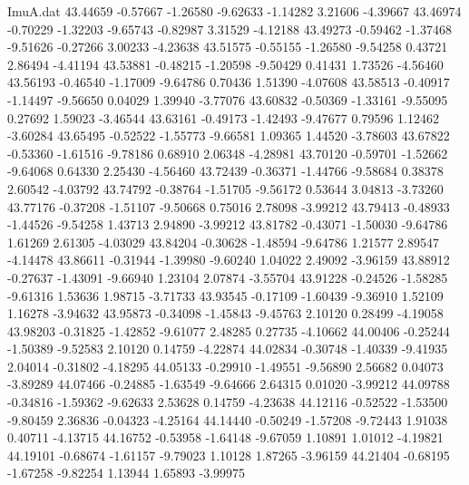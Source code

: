 \begin{filecontents}{ImuA.dat}
  43.44659   -0.57667   -1.26580   -9.62633   -1.14282    3.21606   -4.39667
  43.46974   -0.70229   -1.32203   -9.65743   -0.82987    3.31529   -4.12188
  43.49273   -0.59462   -1.37468   -9.51626   -0.27266    3.00233   -4.23638
  43.51575   -0.55155   -1.26580   -9.54258    0.43721    2.86494   -4.41194
  43.53881   -0.48215   -1.20598   -9.50429    0.41431    1.73526   -4.56460
  43.56193   -0.46540   -1.17009   -9.64786    0.70436    1.51390   -4.07608
  43.58513   -0.40917   -1.14497   -9.56650    0.04029    1.39940   -3.77076
  43.60832   -0.50369   -1.33161   -9.55095    0.27692    1.59023   -3.46544
  43.63161   -0.49173   -1.42493   -9.47677    0.79596    1.12462   -3.60284
  43.65495   -0.52522   -1.55773   -9.66581    1.09365    1.44520   -3.78603
  43.67822   -0.53360   -1.61516   -9.78186    0.68910    2.06348   -4.28981
  43.70120   -0.59701   -1.52662   -9.64068    0.64330    2.25430   -4.56460
  43.72439   -0.36371   -1.44766   -9.58684    0.38378    2.60542   -4.03792
  43.74792   -0.38764   -1.51705   -9.56172    0.53644    3.04813   -3.73260
  43.77176   -0.37208   -1.51107   -9.50668    0.75016    2.78098   -3.99212
  43.79413   -0.48933   -1.44526   -9.54258    1.43713    2.94890   -3.99212
  43.81782   -0.43071   -1.50030   -9.64786    1.61269    2.61305   -4.03029
  43.84204   -0.30628   -1.48594   -9.64786    1.21577    2.89547   -4.14478
  43.86611   -0.31944   -1.39980   -9.60240    1.04022    2.49092   -3.96159
  43.88912   -0.27637   -1.43091   -9.66940    1.23104    2.07874   -3.55704
  43.91228   -0.24526   -1.58285   -9.61316    1.53636    1.98715   -3.71733
  43.93545   -0.17109   -1.60439   -9.36910    1.52109    1.16278   -3.94632
  43.95873   -0.34098   -1.45843   -9.45763    2.10120    0.28499   -4.19058
  43.98203   -0.31825   -1.42852   -9.61077    2.48285    0.27735   -4.10662
  44.00406   -0.25244   -1.50389   -9.52583    2.10120    0.14759   -4.22874
  44.02834   -0.30748   -1.40339   -9.41935    2.04014   -0.31802   -4.18295
  44.05133   -0.29910   -1.49551   -9.56890    2.56682    0.04073   -3.89289
  44.07466   -0.24885   -1.63549   -9.64666    2.64315    0.01020   -3.99212
  44.09788   -0.34816   -1.59362   -9.62633    2.53628    0.14759   -4.23638
  44.12116   -0.52522   -1.53500   -9.80459    2.36836   -0.04323   -4.25164
  44.14440   -0.50249   -1.57208   -9.72443    1.91038    0.40711   -4.13715
  44.16752   -0.53958   -1.64148   -9.67059    1.10891    1.01012   -4.19821
  44.19101   -0.68674   -1.61157   -9.79023    1.10128    1.87265   -3.96159
  44.21404   -0.68195   -1.67258   -9.82254    1.13944    1.65893   -3.99975

\end{filecontents}
